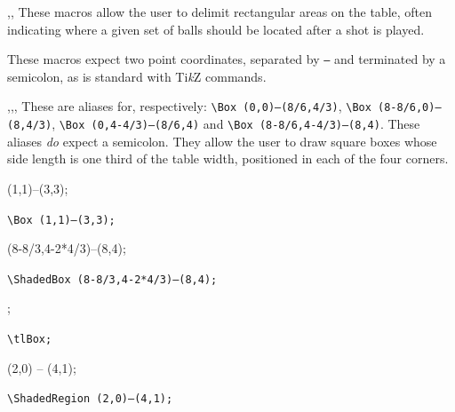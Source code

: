 \documentclass[11pt,a4paper]{ltxdoc}
\def\bluett#1{{\color{blue}\texttt{#1}}}
\begin{document}
\begin{macro}{\Box,\ShadedRegion,\ShadedBox}
    These macros allow the user to delimit rectangular areas on the table, often indicating where a given set of balls should be located after a shot is played.

    These macros expect two point coordinates, separated by \texttt{--} and terminated by a semicolon, as is standard with Ti\textit{k}Z commands.
\end{macro}

\begin{macro}{\blBox,\brBox,\tlBox,\trBox}
    These are aliases for, respectively: \texttt{\textbackslash Box (0,0)--(8/6,4/3)}, \texttt{\textbackslash Box (8-8/6,0)--(8,4/3)}, \texttt{\textbackslash Box (0,4-4/3)--(8/6,4)} and \texttt{\textbackslash Box (8-8/6,4-4/3)--(8,4)}. These aliases \textit{do} expect a semicolon. They allow the user to draw square boxes whose side length is one third of the table width, positioned in each of the four corners.\medskip

    \begin{minipage}{.5\linewidth}
    \centering
        \begin{bTable}[scale=.75]
            \Box (1,1)--(3,3);
        \end{bTable}\par
        \bluett{\textbackslash Box (1,1)--(3,3);}
    \end{minipage}
    \begin{minipage}{.5\linewidth}
    \centering
        \begin{bTable}[scale=.75]
            \ShadedBox (8-8/3,4-2*4/3)--(8,4);
        \end{bTable}\par
        \bluett{\textbackslash ShadedBox (8-8/3,4-2*4/3)--(8,4);}
    \end{minipage}

    \begin{minipage}{.5\linewidth}
    \centering
        \begin{bTable}[scale=.75]
            \tlBox;
        \end{bTable}\par
        \bluett{\textbackslash tlBox;}
    \end{minipage}
    \begin{minipage}{.5\linewidth}
    \centering
        \begin{bTable}[scale=.75]
            \ShadedRegion (2,0) -- (4,1);
        \end{bTable}\par
        \bluett{\textbackslash ShadedRegion (2,0)--(4,1);}
    \end{minipage}\medskip


\end{macro}
\end{document}
